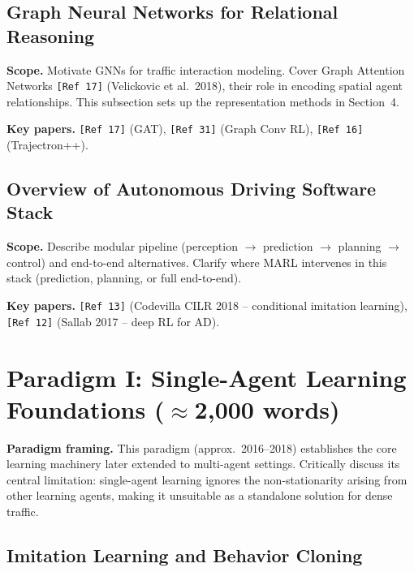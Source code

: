 \documentclass[12pt, a4paper]{article}
\begin{document}
\subsection{Graph Neural Networks for Relational Reasoning}

\begin{outline_note}
\textbf{Scope.}
Motivate GNNs for traffic interaction modeling.
Cover Graph Attention Networks \texttt{[Ref\,17]} (Velickovic et al.\ 2018),
their role in encoding spatial agent relationships.
This subsection sets up the representation methods in Section~4.

\textbf{Key papers.}
\texttt{[Ref\,17]} (GAT), \texttt{[Ref\,31]} (Graph Conv RL),
\texttt{[Ref\,16]} (Trajectron++).
\end{outline_note}

\subsection{Overview of Autonomous Driving Software Stack}

\begin{outline_note}
\textbf{Scope.}
Describe modular pipeline (perception $\to$ prediction $\to$ planning $\to$
control) and end-to-end alternatives.
Clarify where MARL intervenes in this stack (prediction, planning,
or full end-to-end).

\textbf{Key papers.}
\texttt{[Ref\,13]} (Codevilla CILR 2018 -- conditional imitation learning),
\texttt{[Ref\,12]} (Sallab 2017 -- deep RL for AD).
\end{outline_note}

\section{Paradigm I: Single-Agent Learning Foundations \textnormal{\small ($\approx$2{,}000 words)}}
\label{sec:paradigm1}

\begin{outline_note}
\textbf{Paradigm framing.}
This paradigm (approx.\ 2016--2018) establishes the core learning machinery
later extended to multi-agent settings.  Critically discuss its central
limitation: single-agent learning ignores the non-stationarity arising
from other learning agents, making it unsuitable as a standalone solution
for dense traffic.
\end{outline_note}

\subsection{Imitation Learning and Behavior Cloning}
\end{document}
